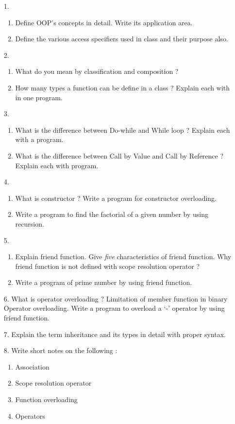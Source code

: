 \documentclass[12pt]{article}
\begin{document}
\begin{enumerate}

	\item[1.]
	\begin{enumerate}
		\item Define OOP's concepts in detail. Write its application area.
		\item Define the various access specifiers used in class and their purpose also.
	\end{enumerate}

	\item[2.]
	\begin{enumerate}
		\item What do you mean by classification and composition ?
		\item How many types a function can be define in a class ? Explain each with in one program.
	\end{enumerate}

	\item[3.]
	\begin{enumerate}
		\item What is the difference between Do-while and While loop ? Explain each with a program.
		\item What is the difference between Call by Value and Call by Reference ? Explain each with program.
	\end{enumerate}

	\item[4.]
	\begin{enumerate}
		\item What is constructor ? Write a program for constructor overloading.
		\item Write a program to find the factorial of a given number by using recursion.
	\end{enumerate}

	\item[5.]
	\begin{enumerate}
		\item Explain friend function. Give \textit{five} characteristics of friend function. Why friend function is not defined with scope resolution operator ?
		\item Write a program of prime number by using friend function.
	\end{enumerate}

	\item[6.] What is operator overloading ? Limitation of member function in binary Operator overloading. Write a program to overload a `-' operator by using friend function.

	\item[7.] Explain the term inheritance and its types in detail with proper syntax.

	\item[8.] Write short notes on the following :
	\begin{enumerate}
		\item Association
		\item Scope resolution operator
		\item Function overloading
		\item Operators
	\end{enumerate}

\end{enumerate}
\end{document}

